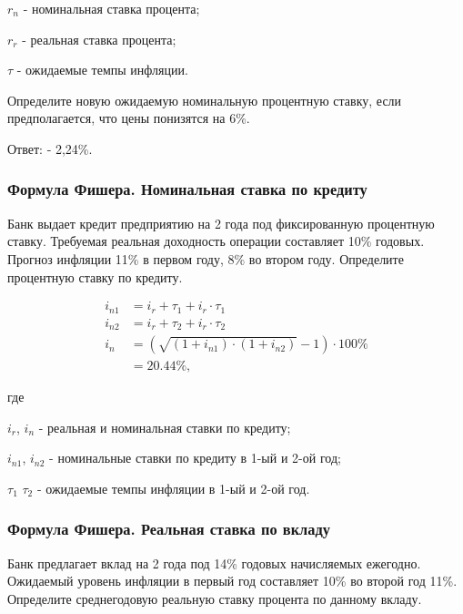 \documentclass[12pt, table, a4paper,twoside]{exam}
\begin{document}
\begin{questions}
\begin{subparts}
\begin{solution}[12em]
	$r_n$ - номинальная ставка процента;
	
	$r_r$ - реальная ставка процента;
	
	$\tau$ - ожидаемые темпы инфляции.
	\end{solution}
		
	\subpart[5] Определите новую ожидаемую номинальную процентную ставку, если предполагается, что цены понизятся на 6\%.
		
	\begin{solution}[12em]
	
		\raggedright
		Ответ: - 2,24\%.
	\end{solution}
	
\end{subparts}

\subsubsection{Формула Фишера. Номинальная ставка по кредиту}
\question[10] Банк выдает кредит предприятию на 2 года под фиксированную процентную ставку. Требуемая реальная доходность операции составляет 10\% годовых. Прогноз инфляции 11\% в первом году, 8\% во втором году. Определите процентную ставку по кредиту.
\begin{solution}[20em]
	\begin{align*}
	i_{n1}&=i_r+\tau_1 + i_r \cdot \tau_1\\
	i_{n2}&=i_r+\tau_2 + i_r \cdot \tau_2\\
	i_n&=\left(\sqrt{(1+i_{n1}) \cdot (1+i_{n2})}-1 \right) \cdot 100\%\\
	&= 20.44\%,
	\end{align*}

	где

	$i_r$, $i_n$ - реальная и номинальная ставки по кредиту;
	

	$i_{n1}$, $i_{n2}$ - номинальные ставки по кредиту в 1-ый и 2-ой год;

	$\tau_1$ $\tau_2$ - ожидаемые темпы инфляции в 1-ый и 2-ой год.	
\end{solution}

\subsubsection{Формула Фишера. Реальная ставка по вкладу}
\question[10] Банк предлагает вклад на 2 года под 14\% годовых начисляемых ежегодно. Ожидаемый уровень инфляции в первый год составляет 10\% во второй год 11\%. Определите среднегодовую реальную ставку процента по данному вкладу.


\end{questions}
\end{document}
